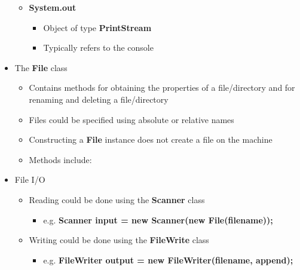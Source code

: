 \begin{itemize}
\begin{itemize}
		\item \textbf{System.out}
		\begin{itemize}
			\item Object of type \textbf{PrintStream}
			\item Typically refers to the console
		\end{itemize}
	\end{itemize}

	\item The \textbf{File} class
	\begin{itemize}
		\item Contains methods for obtaining the properties of a file/directory and
		for renaming and deleting a file/directory
		\item Files could be specified using absolute or relative names
		\item Constructing a \textbf{File} instance does not create a file on the machine
		\item Methods include:
	\end{itemize}

	\item File I/O
	\begin{itemize}
		\item Reading could be done using the \textbf{Scanner} class
		\begin{itemize}
			\item e.g. \textbf{Scanner input = new Scanner(new File(filename));}
		\end{itemize}
		\item Writing could be done using the \textbf{FileWrite} class
		\begin{itemize}
			\item e.g. \textbf{FileWriter output = new FileWriter(filename, append);}
		\end{itemize}
	\end{itemize}


\end{itemize}

